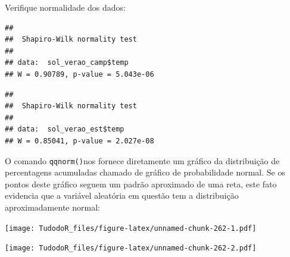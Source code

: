 \documentclass[
]{book}
\newenvironment{Shaded}{\begin{snugshade}}{\end{snugshade}}
\newcommand{\CommentTok}[1]{\textcolor[rgb]{0.56,0.35,0.01}{\textit{#1}}}
\newcommand{\KeywordTok}[1]{\textcolor[rgb]{0.13,0.29,0.53}{\textbf{#1}}}
\newcommand{\NormalTok}[1]{#1}
\newcommand{\OperatorTok}[1]{\textcolor[rgb]{0.81,0.36,0.00}{\textbf{#1}}}
\begin{document}
Verifique normalidade dos dados:

\begin{Shaded}
\end{Shaded}

\begin{verbatim}
## 
##  Shapiro-Wilk normality test
## 
## data:  sol_verao_camp$temp
## W = 0.90789, p-value = 5.043e-06
\end{verbatim}

\begin{Shaded}
\end{Shaded}

\begin{verbatim}
## 
##  Shapiro-Wilk normality test
## 
## data:  sol_verao_est$temp
## W = 0.85041, p-value = 2.027e-08
\end{verbatim}

O comando \texttt{qqnorm()}nos fornece diretamente um gráfico da distribuição de percentagens
acumuladas chamado de gráfico de probabilidade normal. Se os pontos deste gráfico seguem um padrão aproximado de uma reta, este fato evidencia que a variável aleatória em questão tem a distribuição aproximadamente normal:

\begin{Shaded}
\end{Shaded}

\texttt{[image: TudodoR\_files/figure-latex/unnamed-chunk-262-1.pdf]}

\begin{Shaded}
\end{Shaded}

\texttt{[image: TudodoR\_files/figure-latex/unnamed-chunk-262-2.pdf]}
\end{document}

